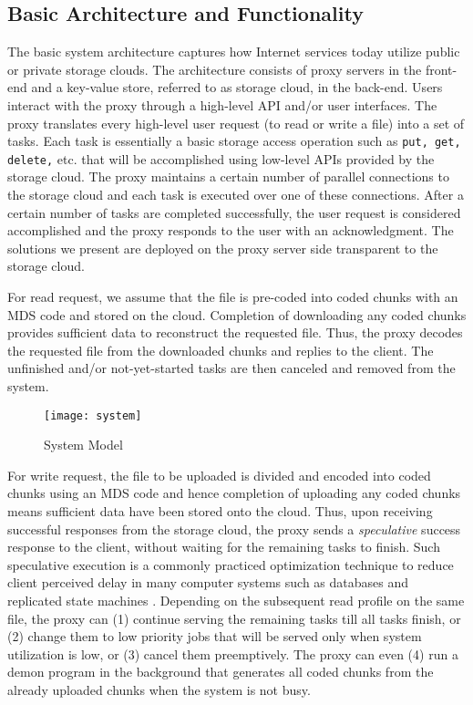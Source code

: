 \documentclass[journal]{IEEEtran}
\begin{document}
\subsection{Basic Architecture and Functionality}
The basic system architecture captures how Internet services today utilize public or private storage clouds.  The architecture consists of proxy servers in the front-end and a key-value store, referred to as  storage cloud, in the back-end. 
Users interact with the proxy through a high-level API and/or user interfaces.  
The proxy translates every high-level user request (to read or write a file) into a set of  tasks. Each task is essentially a basic storage access operation such as {\tt put, get, delete,} etc. that will be accomplished using low-level APIs provided by the storage cloud. The proxy maintains a certain number of parallel connections to the storage cloud and each task is executed over one of these connections. After a certain number of tasks are completed successfully, the user request is considered accomplished and the proxy responds to the user with an acknowledgment. The solutions we present are deployed on the proxy server side transparent to the storage cloud.

For read request, we assume that the file is pre-coded into  coded chunks with an  MDS code and stored on the cloud. Completion of downloading any  coded chunks provides sufficient data to reconstruct the requested file. Thus, the proxy decodes the requested file from the  downloaded chunks and replies to the client. The  unfinished and/or not-yet-started tasks are then canceled and removed from the system. 

\begin{figure}[!t]
\centering
\texttt{[image: system]}
\caption{System Model}
\label{fig:system}
\end{figure}

For write request, the file to be uploaded is divided and encoded into  coded chunks using an  MDS code and hence completion of uploading any  coded chunks means sufficient data have been stored onto the cloud. 
Thus, upon receiving  successful responses from the storage cloud, the proxy sends a {\em speculative} success response to the client, without waiting for the remaining  tasks to finish.
Such speculative execution is a commonly practiced optimization technique to reduce client perceived delay in many computer systems such as databases and replicated state machines \cite{zyzzyva}.
Depending on the subsequent read profile on the same file, the proxy can (1) continue serving the remaining tasks till all  tasks finish, or (2) change them to low priority jobs that will be served only when system utilization is low, or (3) cancel them preemptively. The proxy can even (4) run a demon program in the background that generates all  coded chunks from the already uploaded chunks when the system is not busy.
\end{document}
